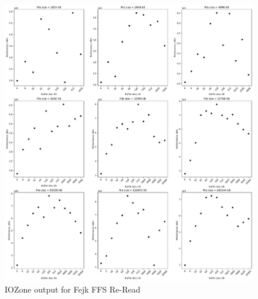 \begin{figure}[!htb]
	\label{fig:bench_fffs_re_read}
	\begin{center}
		\includegraphics[width=1.0\textwidth]{figures/benchmarking/fejk-ffs/Re-Read.pdf}
	\end{center}
	\caption{IOZone output for Fejk FFS \mbox{Re-Read}}
\end{figure}

